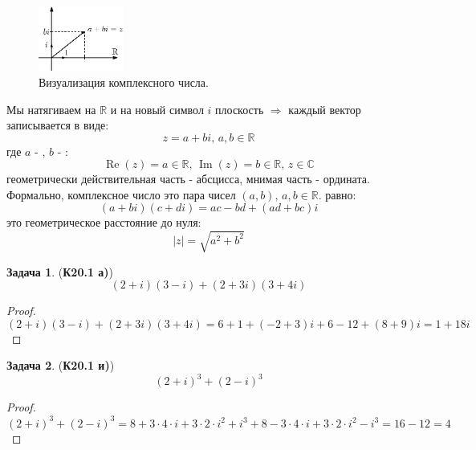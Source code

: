\documentclass[12pt]{article}
\newcommand{\MR}{\mathbb{R}}
\newcommand{\MC}{\mathbb{C}}
\theoremstyle{definition}
\newtheorem{problem}{Задача}
\DeclareMathOperator{\IM}{\operatorname{Im}}
\DeclareMathOperator{\RE}{\operatorname{Re}}
\begin{document}
\begin{figure}[H]
	\centering
	\includegraphics[width=0.25\textwidth]{AL1S1_1.eps}
	\caption{Визуализация комплексного числа.}
	\label{1_1}
\end{figure}
Мы натягиваем на $\MR$ и на новый символ $i$ плоскость $\Rightarrow$ каждый вектор записывается в виде:
$$
	z = a + bi, \, a,b \in \MR
$$ 
где $a$ - , $b$ - :
$$
	\RE{(z)} = a \in \MR,\, \IM{(z)} = b \in \MR, \, z \in \MC
$$
геометрически действительная часть - абсцисса, мнимая часть - ордината. Формально, комплексное число это пара чисел $(a,b), \, a,b \in \MR$.   равно:
$$
	(a + bi)(c + di) = ac - bd + (ad + bc)i
$$
 это геометрическое расстояние до нуля:
$$
	|z| = \sqrt{a^2 + b^2}
$$
\begin{problem}(\textbf{К20.1 а)}) 
	$$
		(2 + i)(3 -i) + (2+ 3i)(3 + 4i)
	$$
\end{problem}
\begin{proof}
	$$
		(2 + i)(3 -i) + (2+ 3i)(3 + 4i) = 6 + 1 + (-2 + 3)i + 6 -12 +(8 + 9)i = 1 + 18i
	$$
\end{proof}

\begin{problem}(\textbf{К20.1 и)}) 
	$$
		(2 + i)^3 + (2 - i)^3 
	$$
\end{problem}
\begin{proof}
	$$
		(2 + i)^3 + (2 - i)^3 = 8 + 3{\cdot}4{\cdot}i + 3{\cdot}2{\cdot}i^2 + i^3 + 8 - 3{\cdot}4{\cdot}i + 3{\cdot}2{\cdot}i^2 - i^3 = 16 -12 = 4
	$$
\end{proof}
\end{document}
